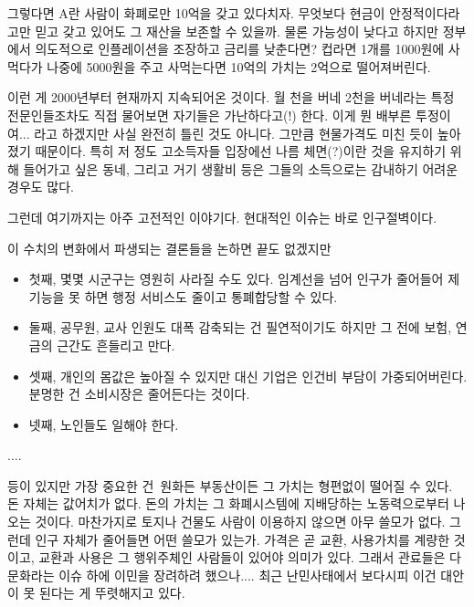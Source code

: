 그렇다면 A란 사람이 화폐로만 10억을 갖고 있다치자.
무엇보다 현금이 안정적이다라고만 믿고 갖고 있어도 그 재산을 보존할 수 있을까.
물론 가능성이 낮다고 하지만 정부에서 의도적으로 인플레이션을 조장하고 금리를 낮춘다면?
컵라면 1개를 1000원에 사먹다가 나중에 5000원을 주고 사먹는다면 10억의 가치는 2억으로 떨어져버린다.
\vspace{5mm}

이런 게 2000년부터 현재까지 지속되어온 것이다.
월 천을 버네 2천을 버네라는 특정 전문인들조차도 직접 물어보면 자기들은 가난하다고(!) 한다.
이게 뭔 배부른 투정이여... 라고 하겠지만 사실 완전히 틀린 것도 아니다.
그만큼 현물가격도 미친 듯이 높아졌기 때문이다.
특히 저 정도 고소득자들 입장에선 나름 체면(?)이란 것을 유지하기 위해 들어가고 싶은 동네, 그리고 거기 생활비 등은
그들의 소득으로는 감내하기 어려운 경우도 많다.
\vspace{5mm}

그런데 여기까지는 아주 고전적인 이야기다. 현대적인 이슈는 바로 인구절벽이다.
\vspace{5mm}

이 수치의 변화에서 파생되는 결론들을 논하면 끝도 없겠지만
\vspace{5mm}
\begin{itemize}
    \item 첫째, 몇몇 시군구는 영원히 사라질 수도 있다. 임계선을 넘어 인구가 줄어들어 제 기능을 못 하면 행정 서비스도 줄이고 통폐합당할 수 있다.
    \item 둘째, 공무원, 교사 인원도 대폭 감축되는 건 필연적이기도 하지만 그 전에 보험, 연금의 근간도 흔들리고 만다.
    \item 셋째, 개인의 몸값은 높아질 수 있지만 대신 기업은 인건비 부담이 가중되어버린다. 분명한 건 소비시장은 줄어든다는 것이다.
    \item 넷째, 노인들도 일해야 한다.
\end{itemize}
\vspace{5mm}

....
\vspace{5mm}

등이 있지만 가장 중요한 건 원화든 부동산이든 그 가치는 형편없이 떨어질 수 있다.
돈 자체는 값어치가 없다. 돈의 가치는 그 화폐시스템에 지배당하는 노동력으로부터 나오는 것이다.
마찬가지로 토지나 건물도 사람이 이용하지 않으면 아무 쓸모가 없다. 그런데 인구 자체가 줄어들면 어떤 쓸모가 있는가.
가격은 곧 교환, 사용가치를 계량한 것이고, 교환과 사용은 그 행위주체인 사람들이 있어야 의미가 있다.
그래서 관료들은 다문화라는 이슈 하에 이민을 장려하려 했으나.... 최근 난민사태에서 보다시피 이건 대안이 못 된다는 게 뚜렷해지고 있다.
\vspace{5mm}

